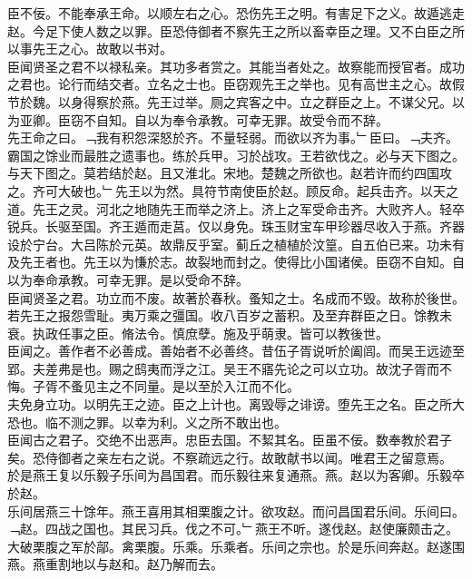 \documentclass{zhvt-classic}
\begin{document}
\hspace*{2em}臣不佞。不能奉承王命。以顺左右之心。恐伤先王之明。有害足下之义。故遁逃走赵。今足下使人数之以罪。臣恐侍御者不察先王之所以畜幸臣之理。又不白臣之所以事先王之心。故敢以书对。\\
\hspace*{2em}臣闻贤圣之君不以禄私亲。其功多者赏之。其能当者处之。故察能而授官者。成功之君也。论行而结交者。立名之士也。臣窃观先王之举也。见有高世主之心。故假节於魏。以身得察於燕。先王过举。厕之宾客之中。立之群臣之上。不谋父兄。以为亚卿。臣窃不自知。自以为奉令承教。可幸无罪。故受令而不辞。\\
\hspace*{2em}先王命之曰。﹁我有积怨深怒於齐。不量轻弱。而欲以齐为事。﹂臣曰。﹁夫齐。霸国之馀业而最胜之遗事也。练於兵甲。习於战攻。王若欲伐之。必与天下图之。与天下图之。莫若结於赵。且又淮北。宋地。楚魏之所欲也。赵若许而约四国攻之。齐可大破也。﹂先王以为然。具符节南使臣於赵。顾反命。起兵击齐。以天之道。先王之灵。河北之地随先王而举之济上。济上之军受命击齐。大败齐人。轻卒锐兵。长驱至国。齐王遁而走莒。仅以身免。珠玉财宝车甲珍器尽收入于燕。齐器设於宁台。大吕陈於元英。故鼎反乎室。蓟丘之植植於汶篁。自五伯已来。功未有及先王者也。先王以为慊於志。故裂地而封之。使得比小国诸侯。臣窃不自知。自以为奉命承教。可幸无罪。是以受命不辞。\\
\hspace*{2em}臣闻贤圣之君。功立而不废。故著於春秋。蚤知之士。名成而不毁。故称於後世。若先王之报怨雪耻。夷万乘之彊国。收八百岁之蓄积。及至弃群臣之日。馀教未衰。执政任事之臣。脩法令。慎庶孽。施及乎萌隶。皆可以教後世。\\
\hspace*{2em}臣闻之。善作者不必善成。善始者不必善终。昔伍子胥说听於阖闾。而吴王远迹至郢。夫差弗是也。赐之鸱夷而浮之江。吴王不寤先论之可以立功。故沈子胥而不悔。子胥不蚤见主之不同量。是以至於入江而不化。\\
\hspace*{2em}夫免身立功。以明先王之迹。臣之上计也。离毁辱之诽谤。堕先王之名。臣之所大恐也。临不测之罪。以幸为利。义之所不敢出也。\\
\hspace*{2em}臣闻古之君子。交绝不出恶声。忠臣去国。不絜其名。臣虽不佞。数奉教於君子矣。恐侍御者之亲左右之说。不察疏远之行。故敢献书以闻。唯君王之留意焉。\\
\hspace*{2em}於是燕王复以乐毅子乐间为昌国君。而乐毅往来复通燕。燕。赵以为客卿。乐毅卒於赵。\\
\hspace*{2em}乐间居燕三十馀年。燕王喜用其相栗腹之计。欲攻赵。而问昌国君乐间。乐间曰。﹁赵。四战之国也。其民习兵。伐之不可。﹂燕王不听。遂伐赵。赵使廉颇击之。大破栗腹之军於鄗。禽栗腹。乐乘。乐乘者。乐间之宗也。於是乐间奔赵。赵遂围燕。燕重割地以与赵和。赵乃解而去。\\
\end{document}

